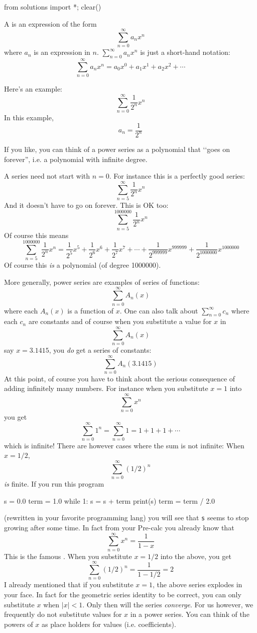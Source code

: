 \begin{python0}
from solutions import *; clear() 
\end{python0}

A  is an expression of the form
\[
\sum_{n=0}^\infty a_n x^n
\]
where $a_n$ is an expression in $n$. 
$\sum_{n=0}^\infty a_n x^n$ is just a short-hand notation:
\[
\sum_{n=0}^\infty a_n x^n
= a_0 x^0 + a_1 x^1 + a_2 x^2 + \cdots
\]

Here's an example:
\[
\sum_{n=0}^\infty \frac{1}{2^n} x^n
\]
In this example, 
\[
a_n = \frac{1}{2^n}
\]

If you like, you can think of a power series as a polynomial that 
\lq\lq goes on forever'',
i.e. a polynomial with infinite degree.

A series need not start with $n = 0$.
For instance this is a perfectly good series:
\[
\sum_{n=5}^\infty \frac{1}{2^n} x^n
\]
And it doesn't have to go on forever.
This is OK too:
\[
\sum_{n=5}^{1000000} \frac{1}{2^n} x^n
\]
Of course this means
\[
\sum_{n=5}^{1000000} \frac{1}{2^n} x^n
= 
\frac{1}{2^5} x^5 +
\frac{1}{2^6} x^6 +
\frac{1}{2^7} x^7 +
\cdots +
\frac{1}{2^{999999}} x^{999999} +
\frac{1}{2^{1000000}} x^{1000000}
\]
Of course this \textit{is} a polynomial (of degree 1000000).


More generally, power series are examples of series of functions:
\[
\sum_{n = 0}^\infty A_n(x)
\]
where each $A_n(x)$ is a function of $x$.
One can also talk about $\sum_{n=0}^\infty c_n$ where
each $c_n$ are constants
and of course when you substitute a value for $x$ in
\[
\sum_{n = 0}^\infty A_n(x)
\]
say $x = 3.1415$, you \textit{do} get a series of constants:
\[
\sum_{n = 0}^\infty A_n(3.1415)
\]
At this point, of course you have to think about the serious
consequence of adding infinitely many numbers.
For instance when you substitute $x = 1$ into
\[
\sum_{n=0}^\infty x^n
\]
you get
\[
\sum_{n=0}^\infty 1^n = \sum_{n=0}^\infty 1 = 1 + 1 + 1 + \cdots
\]
which is infinite!
There are however cases where the sum is not infinite:
When $x = 1/2$,
\[
\sum_{n=0}^\infty (1/2)^n
\]
\textit{is} finite.
If you run this program
\begin{console}
s = 0.0
term = 1.0
while 1:
    s = s + term
    print(s)
    term = term / 2.0 
\end{console}
(rewritten in your favorite programming lang) 
you will see that \verb!s! seems to stop growing after some time.
In fact from your Pre-calc you already know that
\[
\sum_{n=0}^\infty x^n = \frac{1}{1 - x}
\]
This is the famous .
When you substitute $x = 1/2$ into the above, you get
\[
\sum_{n=0}^\infty (1/2)^n = \frac{1}{1 - 1/2} = 2
\]
I already mentioned that if you substitute $x = 1$,
the above series explodes in your face.
In fact for the geometric series identity to be correct,
you can only substitute $x$ when $|x| < 1$.
Only then will the series \textit{converge}.
For us however, we frequently
do not substitute values for 
$x$ in a power series. You can think of the powers of $x$
as place holders for values (i.e. coefficients).



